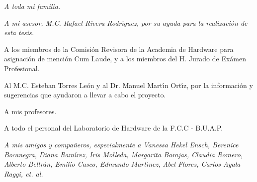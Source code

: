 \begin{titlepage}
\vspace*{3cm}
\begin{center}
{\sl 
A toda mi familia.
}
\end{center}
\end{titlepage}


\begin{titlepage}
\vspace*{1cm}
\end{titlepage}


\begin{titlepage}
\vspace*{3cm}
\begin{center}
{\sl
A mi asesor, M.C. Rafael Rivera Rodr\'{\i}guez, por su ayuda para la rea\-li\-za\-ci\'on de %
esta tesis.

\vspace*{1cm}

A los miembros de la Comisi\'on Revisora de la Academia de Hardware para asignaci\'on de %
menci\'on Cum Laude, y a los miembros del H. Jurado de Ex\'amen Profesional.

\vspace*{1cm}

Al M.C. Esteban Torres Le\'on y al Dr. Manuel Mart\'{\i}n Ort\'{\i}z, por la informaci\'on y %
sugerencias que ayudaron a llevar a cabo el proyecto.

\vspace*{1cm}

A mis profesores.

\vspace*{1cm}

A todo el personal del Laboratorio de Hardware de la F.C.C - B.U.A.P.
}
\end{center}
\end{titlepage}

\begin{titlepage}
\vspace*{1cm}
\end{titlepage}

\begin{titlepage}
\vspace*{3cm}
\begin{center}
{\sl 
A mis amigos y compa\~neros, especialmente a Vanessa Hekel Ensch, Berenice Bocanegra, Diana %
Ram\'{\i}rez, Iris Molleda, Margarita Barajas, Claudia Romero, Alberto Beltr\'an, Emilio Casco, %
Edmundo Mart\'{\i}nez, Abel Flores, Carlos A\-ya\-la Raggi, {\it et. al.}
}
\end{center}
\end{titlepage}
